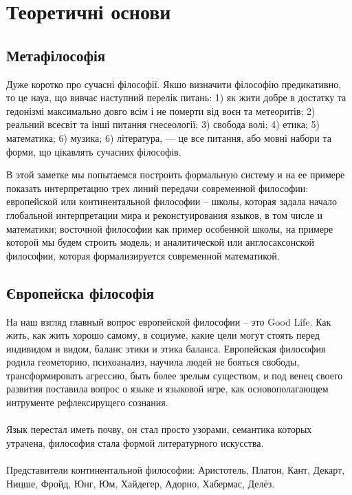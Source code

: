 \section{Теоретичні основи}

\subsection{Метафілософія}

Дуже коротко про сучасні філософії. Якшо визначити філософію предикативно, то це
науа, що вивчає наступний перелік питань: 1) як жити добре в достатку та гедонізмі
максимально довго всім і не померти від воєн та метеоритів; 2) реальний всесвіт
та інші питання гнесеології; 3) свобода волі; 4) етика; 5) математика; 6) музика; 6) література,
--- це все питання, або мовні набори та форми, що цікавлять сучасних філософів.

В этой заметке мы попытаемся построить формальную систему и на ее примере показать интерпретацию трех линий передачи современной философии: европейской или континентальной философии -- школы, которая задала начало глобальной интерпретации мира и реконстуирования языков, в том числе и математики; восточной философии как пример особенной школы, на примере которой мы будем строить модель; и аналитической или англосаксонской философии, которая формализируется современной математикой.

\subsection{Європейска філософія}

На наш взгляд главный вопрос европейской философии -- это Good Life. Как жить, как жить хорошо самому, в социуме, какие цели могут стоять перед индивидом и видом, баланс этики и этика баланса. Европейская философия родила геометорию, психоанализ, научила людей не бояться свободы, трансформировать агрессию, быть более зрелым существом, и под венец своего развития поставила вопрос о языке и языковой игре, как основополагающем интрументе рефлексирущего сознания.
\\
\\
Язык перестал иметь почву, он стал просто узорами, семантика которых утрачена, философия стала формой литературного искусства.
\\
\\
Представители континентальной философии: Аристотель, Платон, Кант, Декарт, Ницше, Фройд, Юнг, Юм, Хайдегер, Адорно, Хабермас, Делёз.

